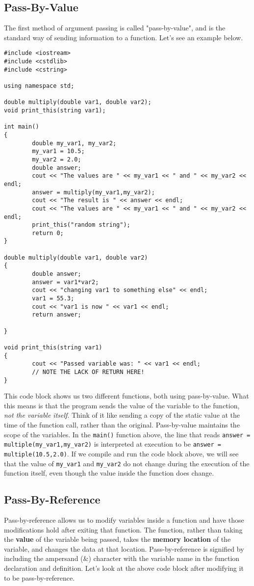 \subsection{Pass-By-Value}
The first method of argument passing is called "pass-by-value", and is the standard way of sending information to a function.  Let's see an example below.

\begin{verbatim}
#include <iostream>
#include <cstdlib>
#include <cstring>

using namespace std;

double multiply(double var1, double var2);
void print_this(string var1);

int main()
{
        double my_var1, my_var2;
        my_var1 = 10.5;
        my_var2 = 2.0;
        double answer;
        cout << "The values are " << my_var1 << " and " << my_var2 << endl;
        answer = multiply(my_var1,my_var2);
        cout << "The result is " << answer << endl;
        cout << "The values are " << my_var1 << " and " << my_var2 << endl;
        print_this("random string");
        return 0;
}

double multiply(double var1, double var2)
{
        double answer;
        answer = var1*var2;
        cout << "changing var1 to something else" << endl;
        var1 = 55.3;
        cout << "var1 is now " << var1 << endl;
        return answer;

}

void print_this(string var1)
{
        cout << "Passed variable was: " << var1 << endl;
        // NOTE THE LACK OF RETURN HERE!
}
\end{verbatim}

This code block shows us two different functions, both using pass-by-value.  What this means is that the program sends the value of the variable to the function, \textit{not the variable itself}.  Think of it like sending a copy of the static value at the time of the function call, rather than the original.  Pass-by-value maintains the scope of the variables.  In the \texttt{main()} function above, the line that reads \texttt{answer = multiple(my\_var1,my\_var2)} is interpreted at execution to be \texttt{answer = multiple(10.5,2.0)}.  If we compile and run the code block above, we will see that the value of \texttt{my\_var1} and \texttt{my\_var2} do not change during the execution of the function itself, even though the value inside the function does change.
\subsection{Pass-By-Reference}
Pass-by-reference allows us to modify variables inside a function and have those modifications hold after exiting that function.  The function, rather than taking the \textbf{value} of the variable being passed, takes the \textbf{memory location} of the variable, and changes the data at that location.  Pass-by-reference is signified by including the ampersand (\&) character with the variable name in the function declaration and definition.  Let's look at the above code block after modifying it to be pass-by-reference.

